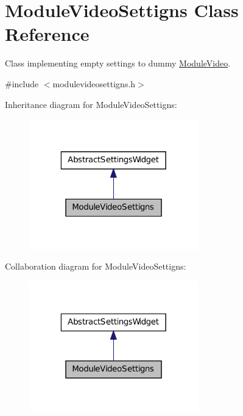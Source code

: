 \hypertarget{class_module_video_settigns}{
\section{ModuleVideoSettigns Class Reference}
\label{d6/d30/class_module_video_settigns}
}


Class implementing empty settings to dummy \hyperlink{class_module_video}{ModuleVideo}.  




{\ttfamily \#include $<$modulevideosettigns.h$>$}



Inheritance diagram for ModuleVideoSettigns:
\nopagebreak
\begin{figure}[H]
\begin{center}
\leavevmode
\includegraphics[width=208pt]{d1/ded/class_module_video_settigns__inherit__graph}
\end{center}
\end{figure}


Collaboration diagram for ModuleVideoSettigns:
\nopagebreak
\begin{figure}[H]
\begin{center}
\leavevmode
\includegraphics[width=208pt]{d0/d8d/class_module_video_settigns__coll__graph}
\end{center}
\end{figure}
